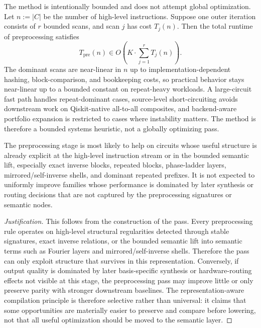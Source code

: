 The method is intentionally bounded and does not attempt global optimization. Let $n := |C|$ be the number of high-level instructions. Suppose one outer iteration consists of $r$ bounded scans, and scan $j$ has cost $T_j(n)$. Then the total runtime of preprocessing satisfies
\[
T_{\mathrm{pre}}(n)
\in
O\!\left(
K \cdot \sum_{j=1}^{r} T_j(n)
\right).
\]
The dominant scans are near-linear in $n$ up to implementation-dependent
hashing, block-comparison, and bookkeeping costs, so practical behavior
stays near-linear up to a bounded constant on repeat-heavy workloads.  A
large-circuit fast path handles repeat-dominant cases, source-level
short-circuiting avoids downstream work on Qiskit-native all-to-all
composites, and backend-aware portfolio expansion is restricted to cases
where instability matters.  The method is therefore a bounded systems
heuristic, not a globally optimizing pass.

\begin{proposition}
The preprocessing stage is most likely to help on circuits whose useful structure is already explicit at the high-level instruction stream or in the bounded semantic lift, especially exact inverse blocks, repeated blocks, phase-ladder layers, mirrored/self-inverse shells, and dominant repeated prefixes. It is not expected to uniformly improve families whose performance is dominated by later synthesis or routing decisions that are not captured by the preprocessing signatures or semantic nodes.
\end{proposition}

\begin{proof}[Justification]
This follows from the construction of the pass. Every preprocessing rule
operates on high-level structural regularities detected through stable
signatures, exact inverse relations, or the bounded semantic lift into semantic
terms such as Fourier layers and mirrored/self-inverse shells. Therefore the
pass can only exploit structure that survives in this representation.
Conversely, if output quality is dominated by later basis-specific synthesis or
hardware-routing effects not visible at this stage, the preprocessing pass may
improve little or only preserve parity with stronger downstream baselines. The
representation-aware compilation principle is therefore selective rather than
universal: it claims that some opportunities are materially easier to preserve
and compare before lowering, not that all useful optimization should be moved
to the semantic layer.
\end{proof}


